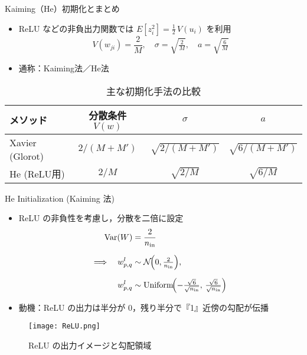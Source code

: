 \documentclass[dvipdfmx,autodetect-engine]{beamer}
\begin{document}
\begin{frame}{Kaiming（He）初期化とまとめ}
  \begin{itemize}
    \item ReLU などの非負出力関数では
      \(E[z_i^2]=\tfrac12\,V(u_i)\) を利用
    \[
      V(w_{ji}) = \frac{2}{M}
      ,\quad
      \sigma = \sqrt{\tfrac{2}{M}}
      ,\quad
      a = \sqrt{\tfrac{6}{M}}
    \]
    \item 通称：Kaiming法／He法
  \end{itemize}
  \vspace{1em}
  \begin{table}
    \centering
    \begin{tabular}{lccc}
      \toprule
      メソッド & 分散条件 \(V(w)\) & \(\sigma\) & \(a\) \\
      \midrule
      Xavier (Glorot) & \(2/(M+M')\) 
        & \(\sqrt{2/(M+M')}\) & \(\sqrt{6/(M+M')}\) \\
      He (ReLU用)    & \(2/M\) 
        & \(\sqrt{2/M}\)      & \(\sqrt{6/M}\)      \\
      \bottomrule
    \end{tabular}
    \caption*{主な初期化手法の比較}
  \end{table}
\end{frame}

\begin{frame}{He Initialization (Kaiming 法)}
  \begin{itemize}
    \item ReLU の非負性を考慮し，分散を二倍に設定
    \[
\begin{aligned}
  \mathrm{Var}(W) &= \frac{2}{n_{\rm in}} \\[6pt]
  \Longrightarrow\quad
  w_{p,q}^l &\sim \mathcal{N}\!\Bigl(0,\tfrac{2}{n_{\rm in}}\Bigr), \\[6pt]
  w_{p,q}^l &\sim \mathrm{Uniform}\!\Bigl(-\tfrac{\sqrt{6}}{\sqrt{n_{\rm in}}},\,\tfrac{\sqrt{6}}{\sqrt{n_{\rm in}}}\Bigr)
\end{aligned}
\]

    \item 動機：ReLU の出力は半分が 0，残り半分で『1』近傍の勾配が伝播  
  \end{itemize}
  \begin{figure}
    \centering
    \texttt{[image: ReLU.png]}
    \caption*{ReLU の出力イメージと勾配領域}
  \end{figure}
\end{frame}
\end{document}
